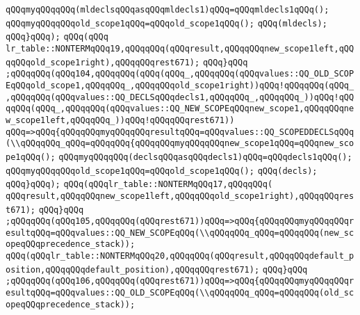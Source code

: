 \verb|qQQqmyqQQqqQQq(mldeclsqQQqasqQQqmldecls1)qQQq=qQQqmldecls1qQQq();|\newline
\verb|qQQqmyqQQqqQQqold_scope1qQQq=qQQqold_scope1qQQq();|\newline
\verb|qQQq(mldecls);|\newline
\verb|qQQq}qQQq);|\newline
\verb|qQQq(qQQq|\newline
\verb|lr_table::NONTERMqQQq19,qQQqqQQq(qQQqresult,qQQqqQQqnew_scope1left,qQQqqQQqold_scope1right),qQQqqQQqrest671);|\newline
\verb|qQQq}qQQq|\newline
\verb|;qQQqqQQq(qQQq104,qQQqqQQq(qQQq(qQQq_,qQQqqQQq(qQQqvalues::QQ_OLD_SCOPEqQQqold_scope1,qQQqqQQq_,qQQqqQQqold_scope1right))qQQq!qQQqqQQq(qQQq_,qQQqqQQq(qQQqvalues::QQ_DECLSqQQqdecls1,qQQqqQQq_,qQQqqQQq_))qQQq!qQQqqQQq(qQQq_,qQQqqQQq(qQQqvalues::QQ_NEW_SCOPEqQQqnew_scope1,qQQqqQQqnew_scope1left,qQQqqQQq_))qQQq!qQQqqQQqrest671))|\newline
\verb|qQQq=>qQQq{qQQqqQQqmyqQQqqQQqresultqQQq=qQQqvalues::QQ_SCOPEDDECLSqQQq(\\qQQqqQQq_qQQq=qQQqqQQq{qQQqqQQqmyqQQqqQQqnew_scope1qQQq=qQQqnew_scope1qQQq();|\newline
\verb|qQQqmyqQQqqQQq(declsqQQqasqQQqdecls1)qQQq=qQQqdecls1qQQq();|\newline
\verb|qQQqmyqQQqqQQqold_scope1qQQq=qQQqold_scope1qQQq();|\newline
\verb|qQQq(decls);|\newline
\verb|qQQq}qQQq);|\newline
\verb|qQQq(qQQqlr_table::NONTERMqQQq17,qQQqqQQq(|\newline
\verb|qQQqresult,qQQqqQQqnew_scope1left,qQQqqQQqold_scope1right),qQQqqQQqrest671);|\newline
\verb|qQQq}qQQq|\newline
\verb|;qQQqqQQq(qQQq105,qQQqqQQq(qQQqrest671))qQQq=>qQQq{qQQqqQQqmyqQQqqQQqresultqQQq=qQQqvalues::QQ_NEW_SCOPEqQQq(\\qQQqqQQq_qQQq=qQQqqQQq(new_scopeqQQqprecedence_stack));|\newline
\verb|qQQq(qQQqlr_table::NONTERMqQQq20,qQQqqQQq(qQQqresult,qQQqqQQqdefault_position,qQQqqQQqdefault_position),qQQqqQQqrest671);|\newline
\verb|qQQq}qQQq|\newline
\verb|;qQQqqQQq(qQQq106,qQQqqQQq(qQQqrest671))qQQq=>qQQq{qQQqqQQqmyqQQqqQQqresultqQQq=qQQqvalues::QQ_OLD_SCOPEqQQq(\\qQQqqQQq_qQQq=qQQqqQQq(old_scopeqQQqprecedence_stack));|\newline
